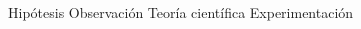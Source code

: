 \documentclass[12pt,addpoints]{evalua}
\begin{document}
\begin{questions}
\begin{multicols}{2}
\begin{parts}
                  \begin{choices}
                        \choice Hipótesis
                        \choice Observación
                        \choice Teoría científica
                        \CorrectChoice Experimentación
                  \end{choices}








\end{parts}
\end{multicols}
\end{questions}
\end{document}
